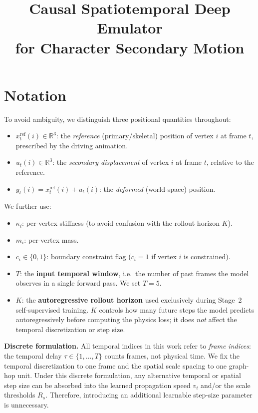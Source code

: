\documentclass[10pt,twocolumn]{article}
\title{Causal Spatiotemporal Deep Emulator\\for Character Secondary Motion}
\author{}
\date{}
\begin{document}
\maketitle

\section{Notation}

To avoid ambiguity, we distinguish three positional quantities throughout:
\begin{itemize}
    \item $x^{\mathrm{ref}}_t(i) \in \mathbb{R}^3$: the \emph{reference} (primary/skeletal) position of vertex $i$ at frame $t$, prescribed by the driving animation.
    \item $u_t(i) \in \mathbb{R}^3$: the \emph{secondary displacement} of vertex $i$ at frame $t$, relative to the reference.
    \item $y_t(i) = x^{\mathrm{ref}}_t(i) + u_t(i)$: the \emph{deformed} (world-space) position.
\end{itemize}

We further use:
\begin{itemize}
    \item $\kappa_i$: per-vertex stiffness (to avoid confusion with the rollout horizon $K$).
    \item $m_i$: per-vertex mass.
    \item $c_i \in \{0,1\}$: boundary constraint flag ($c_i=1$ if vertex $i$ is constrained).
    \item $T$: the \textbf{input temporal window}, i.e.\ the number of past frames the model observes in a single forward pass. We set $T=5$.
    \item $K$: the \textbf{autoregressive rollout horizon} used exclusively during Stage~2 self-supervised training. $K$ controls how many future steps the model predicts autoregressively before computing the physics loss; it does \emph{not} affect the temporal discretization or step size.
\end{itemize}

\noindent\textbf{Discrete formulation.}\quad
All temporal indices in this work refer to \emph{frame indices}: the temporal delay $\tau \in \{1,\dots,T\}$ counts frames, not physical time. We fix the temporal discretization to one frame and the spatial scale spacing to one graph-hop unit. Under this discrete formulation, any alternative temporal or spatial step size can be absorbed into the learned propagation speed $v_i$ and/or the scale thresholds $R_s$. Therefore, introducing an additional learnable step-size parameter is unnecessary.
\end{document}
